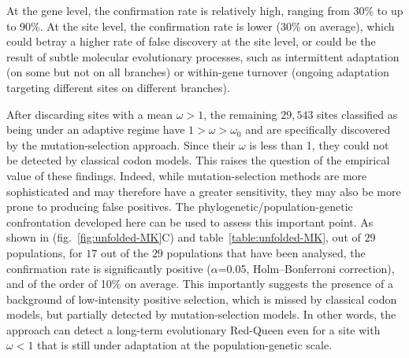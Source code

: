 \documentclass{article}
\begin{document}
    At the gene level, the confirmation rate is relatively high, ranging from 30\% to up to 90\%.
    At the site level, the confirmation rate is lower (30\% on average), which could betray a higher rate of false discovery at the site level, or could be the result of subtle molecular evolutionary processes, such as intermittent adaptation (on some but not on all branches) or within-gene turnover (ongoing adaptation targeting different sites on different branches).

    After discarding sites with a mean $\omega > 1$, the remaining $29,543$ sites classified as being under an adaptive regime have $1 > \omega > \omega_{0}$ and are specifically discovered by the mutation-selection approach.
    Since their $\omega$ is less than 1, they could not be detected by classical codon models.
    This raises the question of the empirical value of these findings.
    Indeed, while mutation-selection methods are more sophisticated and may therefore have a greater sensitivity, they may also be more prone to producing false positives.
    The phylogenetic/population-genetic confrontation developed here can be used to assess this important point.
    As shown in (fig.~\ref{fig:unfolded-MK}C) and table~\ref{table:unfolded-MK}, out of $29$ populations, for $17$ out of the $29$ populations that have been analysed, the confirmation rate is significantly positive ($\alpha$=0.05, Holm–Bonferroni correction), and of the order of 10\% on average.
    This importantly suggests the presence of a background of low-intensity positive selection, which is missed by classical codon models, but partially detected by mutation-selection models.
    In other words, the approach can detect a long-term evolutionary Red-Queen even for a site with $\omega < 1$ that is still under adaptation at the population-genetic scale.
\end{document}
